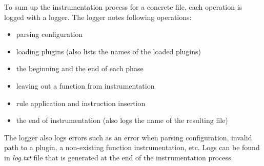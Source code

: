 To sum up the instrumentation process for a concrete file, each operation is
logged with a logger. The logger notes following operations:
\begin{itemize}
  \item parsing configuration
  \item loading plugins (also lists the names of the loaded plugins)
  \item the beginning and the end of each phase
  \item leaving out a function from instrumentation
  \item rule application and instruction insertion
  \item the end of instrumentation (also logs the name of the resulting file)
\end{itemize}
The logger also logs errors such as an error when parsing configuration,
invalid path to a plugin, a non-existing function instrumentation, etc. Logs
can be found in \emph{log.txt} file that is generated at the end of the
instrumentation process.

